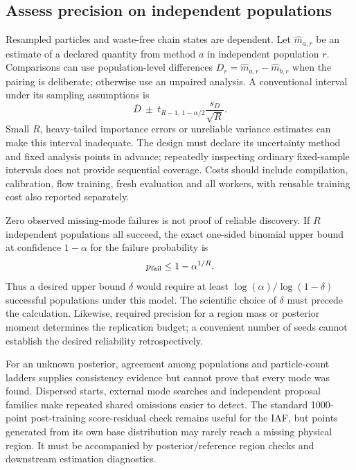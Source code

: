 \subsection{Assess precision on independent populations}

Resampled particles and waste-free chain states are dependent. Let
$\widehat m_{a,r}$ be an estimate of a declared quantity from method $a$
in independent population $r$. Comparisons can use population-level
differences $D_r=\widehat m_{a,r}-\widehat m_{b,r}$ when the pairing is
deliberate; otherwise use an unpaired analysis. A conventional interval
under its sampling assumptions is
\begin{equation}
 \overline D\ \pm\
 t_{R-1,\,1-\alpha/2}\frac{s_D}{\sqrt R}.
 \label{eq:bf-is-smc-replicate-interval}
\end{equation}
Small $R$, heavy-tailed importance errors or unreliable variance estimates
can make this interval inadequate. The design must declare its uncertainty
method and fixed analysis points in advance; repeatedly inspecting ordinary
fixed-sample intervals does not provide sequential coverage. Costs should
include compilation, calibration, flow training, fresh evaluation and all
workers, with reusable training cost also reported separately.

Zero observed missing-mode failures is not proof of reliable discovery.
If $R$ independent populations all succeed, the exact one-sided binomial
upper bound at confidence $1-\alpha$ for the failure probability is
\begin{equation}
 p_{\rm fail}\le 1-\alpha^{1/R}.
 \label{eq:bf-is-smc-failure-bound}
\end{equation}
Thus a desired upper bound $\delta$ would require at least
$\log(\alpha)/\log(1-\delta)$ successful populations under this model.
The scientific choice of $\delta$ must precede the calculation. Likewise,
required precision for a region mass or posterior moment determines the
replication budget; a convenient number of seeds cannot establish the
desired reliability retrospectively.

For an unknown posterior, agreement among populations and particle-count
ladders supplies consistency evidence but cannot prove that every mode was
found. Dispersed starts, external mode searches and independent proposal
families make repeated shared omissions easier to detect. The standard
1000-point post-training score-residual check remains useful for the IAF,
but points generated from its own base distribution may rarely reach a
missing physical region. It must be accompanied by posterior/reference
region checks and downstream estimation diagnostics.


